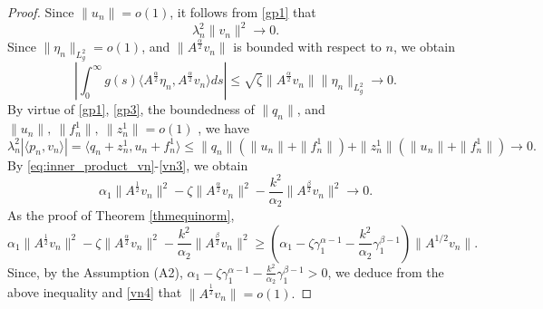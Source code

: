 \documentclass[10pt,a4paper]{amsart}
\begin{document}
\begin{proof}
		Since $\|u_n\|=o(1)$, it follows from \eqref{gp1} that
		\begin{equation}\label{vn1}
			\lambda_n^2 \|v_n\|^2 \to0.
		\end{equation}
		Since $\|\eta_n\|_{L_g^2}=o(1)$, and $\| A^{\frac{\alpha}{2}} v_n \|$ is bounded with respect to $n$, we obtain
		\begin{equation}\label{vn2}
			\left| \int_0^\infty g(s) \langle A^{\frac{\alpha}{2}} \eta_n, A^{\frac{\alpha}{2}} v_n \rangle ds \right| \leq \sqrt{\zeta} \|A^{\frac{\alpha}{2}} v_n\|\|\eta_n\|_{L_g^2} \to 0.
		\end{equation}
		By virtue of \eqref{gp1}, \eqref{gp3}, the boundedness of $\|q_n\|$, and $\|u_n\|,~\|f_n^1\|,~\|z_n^1\|=o(1)$ , we have
		\begin{equation}\label{vn3}
			\lambda_n^2 |\langle p_n, v_n \rangle|
			=  \langle q_n+z_n^1, u_n+f_n^1 \rangle\le\|q_n\|(\|u_n\|+\|f_n^1\|)+\|z_n^1\|(\|u_n\|+\|f_n^1\|) \to 0.
		\end{equation}
		By \eqref{eq:inner_product_vn}-\eqref{vn3}, we obtain
		\begin{equation}\label{vn4}
			\alpha_1 \| A^{\frac{1}{2}} v_n \|^2
			- \zeta \| A^{\frac{\alpha}{2}} v_n \|^2
			- \frac{k^2}{\alpha_2} \| A^{\frac{\beta}{2}} v_n \|^2
			\to 0.
		\end{equation}
As the proof of Theorem \ref{thmequinorm},
$$\alpha_1 \| A^{\frac{1}{2}} v_n \|^2
			- \zeta \| A^{\frac{\alpha}{2}} v_n \|^2
			- \frac{k^2}{\alpha_2} \| A^{\frac{\beta}{2}} v_n \|^2\ge\left(\alpha_1-\zeta\gamma_1^{\alpha-1}-\frac{k^2}{\alpha_2}\gamma_1^{\beta-1}\right)\|A^{1/2}v_n\|.$$
Since, by the Assumption (A2), $\alpha_1-\zeta\gamma_1^{\alpha-1}-\frac{k^2}{\alpha_2}\gamma_1^{\beta-1}>0$, we deduce from the above inequality and \eqref{vn4} that  $\| A^{\frac{1}{2}} v_n \|=o(1).$
		

\end{proof}
\end{document}
